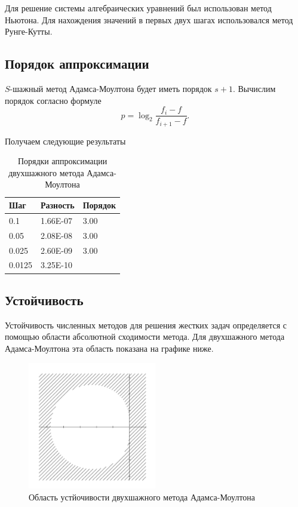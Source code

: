 \documentclass[12pt, a4paper]{article}
\begin{document}
Для решение системы алгебраических уравнений был использован метод Ньютона. Для нахождения значений в первых двух шагах использовался метод Рунге-Кутты.

\subsection{Порядок аппроксимации}

$S$-шажный метод Адамса-Моултона будет иметь порядок $s + 1$. 
Вычислим порядок согласно формуле 
\begin{equation}
	\label{approx_formula}
	p = \log_2 \frac{f_i - f}{f_{i+1} - f}.
\end{equation}

Получаем следующие результаты
\begin{table}[hbt!]
	\centering
	\begin{tabular}{|l|l|l|} 
		\hline
		Шаг      & Разность     & Порядок            \\ 
		\hline
		0.1    & 1.66E-07 & 3.00  \\ 
		\hline
		0.05   & 2.08E-08 & 3.00   \\ 
		\hline
		0.025  & 2.60E-09 & 3.00  \\ 
		\hline
		0.0125 & 3.25E-10 &              \\
		\hline
	\end{tabular}
	\vspace*{4mm}
	\label{table-Adams-2}
	\caption{Порядки аппроксимации двухшажного метода Адамса-Моултона}
\end{table}

\newpage

\subsection{Устойчивость}

Устойчивость численных методов для решения жестких задач определяется с помощью области абсолютной сходимости метода. Для двухшажного метода Адамса-Моултона эта область показана на графике ниже.
\begin{figure}[hbt!]
	\centering
	\includegraphics[width=0.5\textwidth]{lin-stab-a-m-2}%
	\caption{Область устйочивости двухшажного метода Адамса-Моултона~\cite{cambridge}}
	\vspace*{-2mm}
	\label{lin-stab-a-m-2}
\end{figure}
\end{document}
